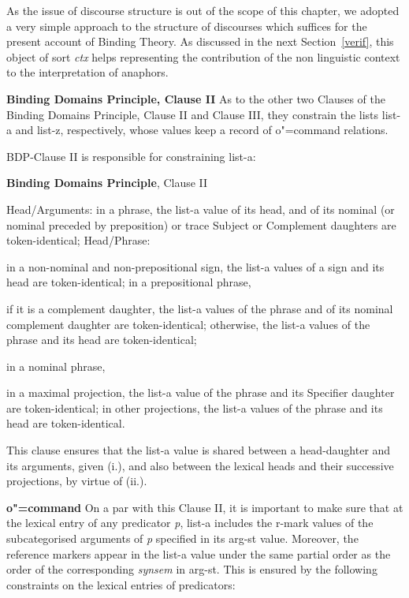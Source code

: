 \documentclass[output=paper
	        ,collection
	        ,collectionchapter
 	        ,biblatex
                ,babelshorthands
                ,newtxmath
                ,draftmode
                ,colorlinks, citecolor=brown
]{langscibook}
\begin{document}
As the issue of discourse structure is out
of the scope of this chapter, we adopted a very simple approach to the 
structure of discourses
which suffices for the present account of Binding Theory.
As discussed in the next \mbox{Section \ref{verif},} this object
of sort {\em ctx} helps representing the contribution of the non linguistic context to the 
interpretation of anaphors.

\textbf{Binding Domains Principle, Clause II} As to the other two Clauses of the Binding Domains Principle, 
Clause II and Clause III,
they constrain the lists {\sc list-a} and {\sc list-z}, respectively,
whose values keep a record of o"=command relations.

BDP-Clause II is responsible for constraining {\sc list-a}:

\begin{exe}
\ex
\textbf{Binding Domains Principle}, Clause II
\begin{xlisti}
\ex	Head/Arguments: in a phrase, the {\sc list-a} value of its head, and of its nominal (or
nominal preceded by preposition) or trace Subject or Complement daughters are
token-identical;
\ex Head/Phrase:
\begin{xlisti}
\ex	in a non-nominal and non-prepositional sign, the {\sc list-a} values of a sign and its
head are token-identical;
\ex	in a prepositional phrase,
\begin{itemize}
\ex if it is a complement daughter, the {\sc list-a} values of the phrase and of its nominal
complement daughter are token-identical;
\ex otherwise, the {\sc list-a} values of the phrase and its head are token-identical;
\end{itemize}
\ex	in a nominal phrase,
\begin{itemize} 
\ex in a maximal projection, the {\sc list-a} value of the phrase and its Specifier daughter
are token-identical;
\ex in other projections, the {\sc list-a} values of the phrase and its head are
token-identical.
\end{itemize}
\end{xlisti}
\end{xlisti}
\end{exe}

This clause ensures that the {\sc list-a} value is shared between a head-daughter and its arguments, given (i.),
and also between the lexical heads and their successive projections, by virtue of (ii.).

\textbf{o"=command} On a par with this Clause II, it is important to make sure
that at the lexical entry of any predicator {\it p}, {\sc list-a} includes 
the {\sc r-mark}
values of the  subcategorised arguments of {\it p} specified in its
{\sc arg-st} value. Moreover, the reference markers appear in the {\sc list-a} 
value under the same partial order as the order of the corresponding {\em synsem} 
in {\sc arg-st}. This is ensured by the following constraints on the lexical 
entries of predicators:
\end{document}
